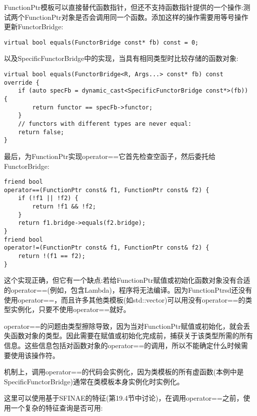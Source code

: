 FunctionPtr模板可以直接替代函数指针，但还不支持函数指针提供的一个操作:测试两个FunctionPtr对象是否会调用同一个函数。添加这样的操作需要用等号操作更新FunctorBridge:

\begin{lstlisting}[style=styleCXX]
virtual bool equals(FunctorBridge const* fb) const = 0;
\end{lstlisting}

以及SpecificFunctorBridge中的实现，当具有相同类型时比较存储的函数对象:

\begin{lstlisting}[style=styleCXX]
virtual bool equals(FunctorBridge<R, Args...> const* fb) const override {
	if (auto specFb = dynamic_cast<SpecificFunctorBridge const*>(fb)) {
		return functor == specFb->functor;
	}
	// functors with different types are never equal:
	return false;
}
\end{lstlisting}

最后，为FunctionPtr实现operator==它首先检查空函子，然后委托给FunctorBridge:

\begin{lstlisting}[style=styleCXX]
friend bool
operator==(FunctionPtr const& f1, FunctionPtr const& f2) {
	if (!f1 || !f2) {
		return !f1 && !f2;
	}
	return f1.bridge->equals(f2.bridge);
}
friend bool
operator!=(FunctionPtr const& f1, FunctionPtr const& f2) {
	return !(f1 == f2);
}
\end{lstlisting}

这个实现正确，但它有一个缺点:若给FunctionPtr赋值或初始化函数对象没有合适的operator==(例如，包含Lambda)，程序将无法编译。因为FunctionPtrsd还没有使用operator==，而且许多其他类模板(如std::vector)可以用没有operator==的类型实例化，只要不使用operator==就好。

operator==的问题由类型擦除导致，因为当对FunctionPtr赋值或初始化，就会丢失函数对象的类型。因此需要在赋值或初始化完成前，捕获关于该类型所需的所有信息。这些信息包括对函数对象的operator==的调用，所以不能确定什么时候需要使用该操作符。

\begin{tcolorbox}[colback=webgreen!5!white,colframe=webgreen!75!black]
\hspace*{0.75cm}机制上，调用operator==的代码会实例化，因为类模板的所有虚函数(本例中是SpecificFunctorBridge)通常在类模板本身实例化时实例化。
\end{tcolorbox}

这里可以使用基于SFINAE的特征(第19.4节中讨论)，在调用operator==之前，使用一个复杂的特征查询是否可用:

